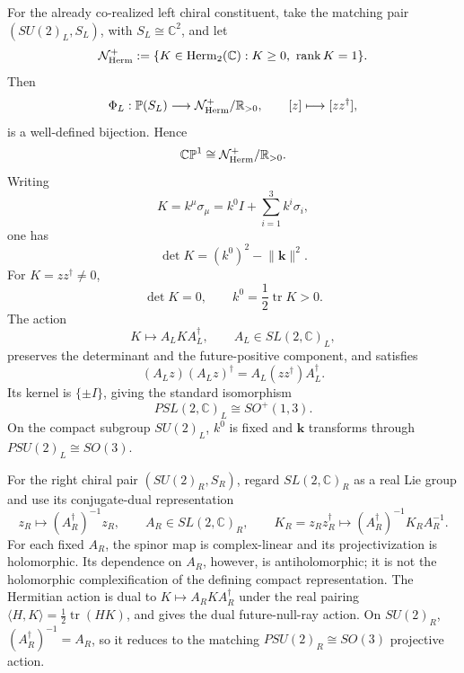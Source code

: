 \documentclass[12pt,a4paper]{article}
\begin{document}
\begin{theorem}
\label{p2e:thm:celestial-hermitian-ray-bridge}
For the already co-realized left chiral constituent, take the matching pair
\((SU(2)_L,S_L)\), with \(S_L\cong\mathbb C^2\), and let
\[
 \mathcal N_{\rm Herm}^{+}
 :=
 \{K\in\operatorname{Herm}_2(\mathbb C):
       K\ge0,\ \operatorname{rank}K=1\}.
\]
Then
\[
 \Phi_L:\mathbb P(S_L)\longrightarrow
 \mathcal N_{\rm Herm}^{+}/\mathbb R_{>0},
 \qquad
 [z]\longmapsto[zz^\dagger],
\]
is a well-defined bijection.  Hence
\[
        \mathbb{CP}^1
        \cong
        \mathcal N_{\rm Herm}^{+}/\mathbb R_{>0}.
\]
Writing
\[
        K=k^\mu\sigma_\mu
        =k^0I+\sum_{i=1}^3k^i\sigma_i,
\]
one has
\[
        \det K=(k^0)^2-\lVert\mathbf k\rVert^2.
\]
For \(K=zz^\dagger\ne0\),
\[
        \det K=0,
        \qquad
        k^0=\frac12\operatorname{tr}K>0.
\]
The action
\[
        K\longmapsto A_LKA_L^\dagger,
        \qquad A_L\in SL(2,\mathbb C)_L,
\]
preserves the determinant and the future-positive component, and satisfies
\[
        (A_Lz)(A_Lz)^\dagger=A_L(zz^\dagger)A_L^\dagger.
\]
Its kernel is \(\{\pm I\}\), giving the standard isomorphism
\[
        PSL(2,\mathbb C)_L\cong SO^+(1,3).
\]
On the compact subgroup \(SU(2)_L\), \(k^0\) is fixed and
\(\mathbf k\) transforms through \(PSU(2)_L\cong SO(3)\).

For the right chiral pair \((SU(2)_R,S_R)\), regard
\(SL(2,\mathbb C)_R\) as a real Lie group and use its conjugate-dual
representation
\[
        z_R\longmapsto(A_R^\dagger)^{-1}z_R,
        \qquad A_R\in SL(2,\mathbb C)_R,
        \qquad
        K_R=z_Rz_R^\dagger
        \longmapsto
        (A_R^\dagger)^{-1}K_RA_R^{-1}.
\]
For each fixed \(A_R\), the spinor map is complex-linear and its
projectivization is holomorphic.  Its dependence on \(A_R\), however, is
antiholomorphic; it is not the holomorphic complexification of the defining
compact representation.  The Hermitian action is dual to
\(K\mapsto A_RKA_R^\dagger\) under the real pairing
\(\langle H,K\rangle=\tfrac12\operatorname{tr}(HK)\), and gives the dual
future-null-ray action.  On \(SU(2)_R\),
\((A_R^\dagger)^{-1}=A_R\), so it reduces to the matching
\(PSU(2)_R\cong SO(3)\) projective action.
\end{theorem}
\end{document}
